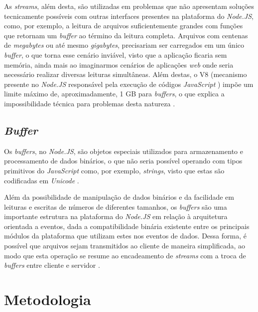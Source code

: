 \documentclass[12pt]{article}
\begin{document}
As \textit{streams}, além desta, são utilizadas em problemas que não apresentam soluções tecnicamente
possíveis com outras interfaces presentes na plataforma do \textit{Node.JS}, como, por exemplo, a leitura de 
arquivos suficientemente grandes com funções que retornam um \textit{buffer} ao término da leitura completa. Arquivos com 
centenas de \textit{megabytes} ou até mesmo \textit{gigabytes}, precisariam ser carregados em um único 
\textit{buffer}, o que torna esse cenário inviável, visto que a aplicação ficaria sem memória, ainda mais ao 
imaginarmos cenários de aplicações  \textit{web} onde seria necessário realizar diversas leituras simultâneas.
Além destas, o V8 (mecanismo presente no \textit{Node.JS} responsável pela execução de códigos \textit{JavaScript} \cite{NODEV8}) impõe 
um limite máximo de, aproximadamente, 1 GB para \textit{buffers}, o que explica a impossibilidade técnica para problemas 
desta natureza \cite[p. 122]{MARIO}.

\subsection{\textit{Buffer}}

Os \textit{buffers}, no \textit{Node.JS}, são objetos especiais utilizados para armazenamento e processamento 
de dados binários, o que não seria possível operando com tipos primitivos do \textit{JavaScript} como, por exemplo,
\textit{strings}, visto que estas são codificadas em \textit{Unicode} \cite[p. 29]{DIOGORESENDE}.

Além da possibilidade de manipulação de dados binários e da facilidade em leituras e escritas de números de diferentes 
tamanhos, os \textit{buffers} são uma importante estrutura na plataforma do \textit{Node.JS} em relação à arquitetura
orientada a eventos, dada a compatibilidade binária existente entre os principais módulos da plataforma que 
utilizam estes nos eventos de dados. Dessa forma, é possível que arquivos sejam transmitidos ao cliente de maneira 
simplificada, ao modo que esta operação se resume ao encadeamento de \textit{streams} com a troca de 
\textit{buffers} entre cliente e servidor \cite[p. 29]{DIOGORESENDE}.


\section{Metodologia}

\end{document}
